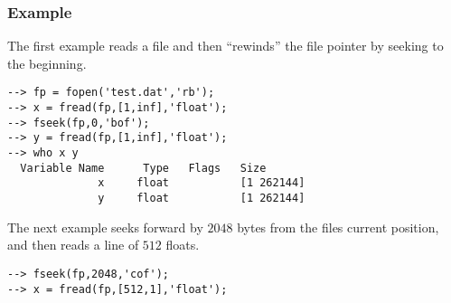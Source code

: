 \subsubsection{Example}
The first example reads a file and then ``rewinds'' the file pointer by seeking to the beginning.
\begin{verbatim}
--> fp = fopen('test.dat','rb');
--> x = fread(fp,[1,inf],'float');
--> fseek(fp,0,'bof');
--> y = fread(fp,[1,inf],'float');
--> who x y
  Variable Name      Type   Flags   Size
              x     float           [1 262144]
              y     float           [1 262144]
\end{verbatim}
The next example seeks forward by $2048$ bytes from the files current position, and then reads a line of $512$ floats.
\begin{verbatim}
--> fseek(fp,2048,'cof');
--> x = fread(fp,[512,1],'float');
\end{verbatim}
